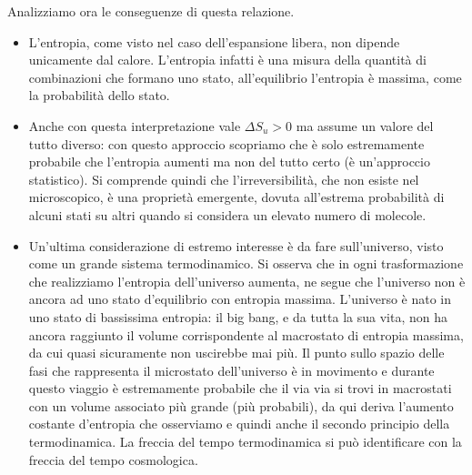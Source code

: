 \documentclass[
10pt, %
a4paper, %
oneside, %
headinclude,footinclude, %
BCOR5mm, %
]{scrartcl}
\begin{document}
Analizziamo ora le conseguenze di questa relazione.  
\begin{itemize}
	\item L'entropia, come visto nel caso dell'espansione libera, non dipende unicamente dal calore. L'entropia infatti è una misura della quantità di combinazioni che formano uno stato, all'equilibrio l'entropia è massima, come la probabilità dello stato. 
	\item Anche con questa interpretazione vale \(\Delta S_u > 0\) ma assume un valore del tutto diverso: con questo approccio scopriamo che è solo estremamente probabile che l'entropia aumenti ma non del tutto certo (è un'approccio statistico). Si comprende quindi che l'irreversibilità, che non esiste nel microscopico, è una proprietà emergente, dovuta all'estrema probabilità di alcuni stati su altri quando si considera un elevato numero di molecole.  
	\item Un'ultima considerazione di estremo interesse è da fare sull'universo, visto come un grande sistema termodinamico. Si osserva che in ogni trasformazione che realizziamo l'entropia dell'universo aumenta, ne segue che l'universo non è ancora ad uno stato d'equilibrio con entropia massima. L'universo è nato in uno stato di bassissima entropia: il big bang, e da tutta la sua vita, non ha ancora raggiunto il volume corrispondente al macrostato di entropia massima, da cui quasi sicuramente non uscirebbe mai più. Il punto sullo spazio delle fasi che rappresenta il  microstato dell'universo è in movimento e durante questo viaggio è estremamente probabile che il via via si trovi in macrostati con un volume associato più grande (più probabili), da qui deriva l'aumento costante d'entropia che osserviamo e quindi anche il secondo principio della termodinamica. La freccia del tempo termodinamica si può  identificare con la freccia del tempo cosmologica.
\end{itemize}
\end{document}
